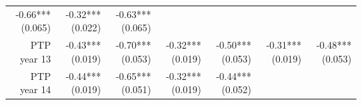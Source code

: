 \documentclass[]{article}
\begin{document}
\begin{longtable}[c]{@{}rrrrrrr@{}}
\begin{minipage}[t]{0.12\columnwidth}
-0.66*** (0.065)
\strut\end{minipage} &
\begin{minipage}[t]{0.11\columnwidth}\raggedleft\strut
-0.32*** (0.022)
\strut\end{minipage} &
\begin{minipage}[t]{0.11\columnwidth}\raggedleft\strut
-0.63*** (0.065)
\strut\end{minipage}\tabularnewline
\begin{minipage}[t]{0.12\columnwidth}\raggedleft\strut
PTP year 13
\strut\end{minipage} &
\begin{minipage}[t]{0.11\columnwidth}\raggedleft\strut
-0.43*** (0.019)
\strut\end{minipage} &
\begin{minipage}[t]{0.12\columnwidth}\raggedleft\strut
-0.70*** (0.053)
\strut\end{minipage} &
\begin{minipage}[t]{0.11\columnwidth}\raggedleft\strut
-0.32*** (0.019)
\strut\end{minipage} &
\begin{minipage}[t]{0.12\columnwidth}\raggedleft\strut
-0.50*** (0.053)
\strut\end{minipage} &
\begin{minipage}[t]{0.11\columnwidth}\raggedleft\strut
-0.31*** (0.019)
\strut\end{minipage} &
\begin{minipage}[t]{0.11\columnwidth}\raggedleft\strut
-0.48*** (0.053)
\strut\end{minipage}\tabularnewline
\begin{minipage}[t]{0.12\columnwidth}\raggedleft\strut
PTP year 14
\strut\end{minipage} &
\begin{minipage}[t]{0.11\columnwidth}\raggedleft\strut
-0.44*** (0.019)
\strut\end{minipage} &
\begin{minipage}[t]{0.12\columnwidth}\raggedleft\strut
-0.65*** (0.051)
\strut\end{minipage} &
\begin{minipage}[t]{0.11\columnwidth}\raggedleft\strut
-0.32*** (0.019)
\strut\end{minipage} &
\begin{minipage}[t]{0.12\columnwidth}\raggedleft\strut
-0.44*** (0.052)
\strut\end{minipage} &
\begin{minipage}[t]{0.11\columnwidth}\raggedleft\strut

\end{minipage}
\end{longtable}
\end{document}
